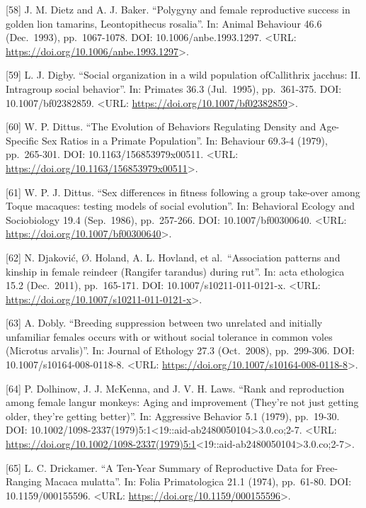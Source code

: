 \documentclass[
]{article}
\begin{document}
{[}58{]} J. M. Dietz and A. J. Baker. ``Polygyny and female reproductive
success in golden lion tamarins, Leontopithecus rosalia''. In: Animal
Behaviour 46.6 (Dec.~1993), pp.~1067-1078. DOI: 10.1006/anbe.1993.1297.
\textless URL: \url{https://doi.org/10.1006/anbe.1993.1297}\textgreater.

{[}59{]} L. J. Digby. ``Social organization in a wild population
ofCallithrix jacchus: II. Intragroup social behavior''. In: Primates
36.3 (Jul.~1995), pp.~361-375. DOI: 10.1007/bf02382859. \textless URL:
\url{https://doi.org/10.1007/bf02382859}\textgreater.

{[}60{]} W. P. Dittus. ``The Evolution of Behaviors Regulating Density
and Age-Specific Sex Ratios in a Primate Population''. In: Behaviour
69.3-4 (1979), pp.~265-301. DOI: 10.1163/156853979x00511. \textless URL:
\url{https://doi.org/10.1163/156853979x00511}\textgreater.

{[}61{]} W. P. J. Dittus. ``Sex differences in fitness following a group
take-over among Toque macaques: testing models of social evolution''.
In: Behavioral Ecology and Sociobiology 19.4 (Sep.~1986), pp.~257-266.
DOI: 10.1007/bf00300640. \textless URL:
\url{https://doi.org/10.1007/bf00300640}\textgreater.

{[}62{]} N. Djaković, Ø. Holand, A. L. Hovland, et al.~``Association
patterns and kinship in female reindeer (Rangifer tarandus) during
rut''. In: acta ethologica 15.2 (Dec.~2011), pp.~165-171. DOI:
10.1007/s10211-011-0121-x. \textless URL:
\url{https://doi.org/10.1007/s10211-011-0121-x}\textgreater.

{[}63{]} A. Dobly. ``Breeding suppression between two unrelated and
initially unfamiliar females occurs with or without social tolerance in
common voles (Microtus arvalis)''. In: Journal of Ethology 27.3
(Oct.~2008), pp.~299-306. DOI: 10.1007/s10164-008-0118-8. \textless URL:
\url{https://doi.org/10.1007/s10164-008-0118-8}\textgreater.

{[}64{]} P. Dolhinow, J. J. McKenna, and J. V. H. Laws. ``Rank and
reproduction among female langur monkeys: Aging and improvement (They're
not just getting older, they're getting better)''. In: Aggressive
Behavior 5.1 (1979), pp.~19-30. DOI:
10.1002/1098-2337(1979)5:1\textless19::aid-ab2480050104\textgreater3.0.co;2-7.
\textless URL:
\url{https://doi.org/10.1002/1098-2337(1979)5:1}\textless19::aid-ab2480050104\textgreater3.0.co;2-7\textgreater.

{[}65{]} L. C. Drickamer. ``A Ten-Year Summary of Reproductive Data for
Free-Ranging Macaca mulatta''. In: Folia Primatologica 21.1 (1974),
pp.~61-80. DOI: 10.1159/000155596. \textless URL:
\url{https://doi.org/10.1159/000155596}\textgreater.
\end{document}
